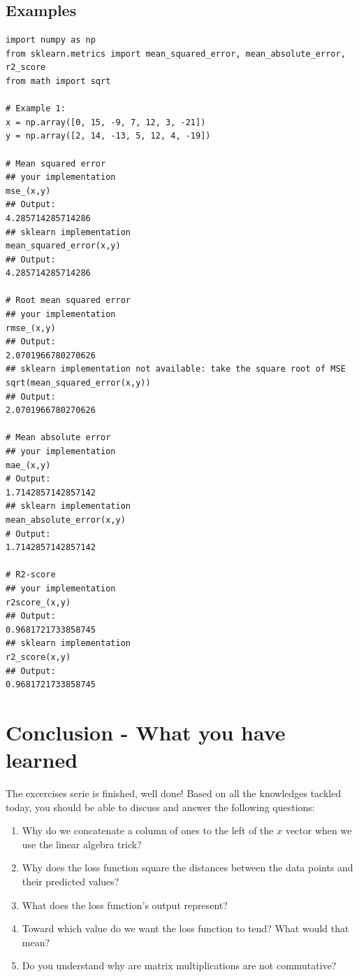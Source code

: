 \documentclass{42-en}
\begin{document}
\section*{Examples}
\begin{verbatim}
import numpy as np
from sklearn.metrics import mean_squared_error, mean_absolute_error, r2_score
from math import sqrt

# Example 1:
x = np.array([0, 15, -9, 7, 12, 3, -21])
y = np.array([2, 14, -13, 5, 12, 4, -19])

# Mean squared error
## your implementation
mse_(x,y)
## Output:
4.285714285714286
## sklearn implementation
mean_squared_error(x,y)
## Output:
4.285714285714286

# Root mean squared error
## your implementation
rmse_(x,y)
## Output:
2.0701966780270626
## sklearn implementation not available: take the square root of MSE
sqrt(mean_squared_error(x,y))
## Output:
2.0701966780270626

# Mean absolute error
## your implementation
mae_(x,y)
# Output:
1.7142857142857142
## sklearn implementation
mean_absolute_error(x,y)
# Output:
1.7142857142857142

# R2-score
## your implementation
r2score_(x,y)
## Output:
0.9681721733858745
## sklearn implementation
r2_score(x,y)
## Output:
0.9681721733858745
\end{verbatim}


\newpage

\chapter{Conclusion - What you have learned}

The excercises serie is finished, well done!
Based on all the knowledges tackled today, you should be able to discuss and answer the following questions:
\begin{enumerate}
  \item Why do we concatenate a column of ones to the left of the $x$ vector when we use the linear algebra trick?   
  
  \item Why does the loss function square the distances between the data points and their predicted values?
  
  \item What does the loss function's output represent?
  
  \item Toward which value do we want the loss function to tend? What would that mean? 
  
  \item Do you understand why are matrix multiplications are not commutative?
\end{enumerate}
\end{document}
